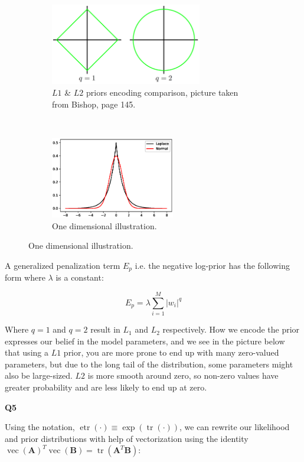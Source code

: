 \documentclass[a4paper]{article}
\DeclareMathOperator{\tr}{tr}
\DeclareMathOperator{\vect}{vec}
\DeclareMathOperator{\etr}{etr}
\begin{document}
\begin{figure}[t!]
	\centering
	\begin{subfigure}[t]{0.5\textwidth}
		\centering
		\includegraphics[height=1.4in]{L2.png}
		\caption{$L1$ \& $L2$ priors encoding comparison, picture taken from Bishop, page 145.}
	\end{subfigure}%
	~ 
	\begin{subfigure}[t]{0.5\textwidth}
		\centering
		\includegraphics[height=1.4in]{Place.eps}
		\caption{One dimensional illustration.}
	\end{subfigure}
\end{figure}

\noindent A generalized penalization term $E_p$ i.e. the negative log-prior has the following form where $\lambda$ is a constant:

\begin{equation*}
E_p=\lambda\sum_{i=1}^{M}\vert w_i\vert^{q}
\end{equation*}

\noindent Where $q=1$ and $q=2$ result in $L_1$ and $L_2$ respectively. How we encode the prior expresses our belief in the model parameters, and we see in the picture below that using a $L1$ prior, you are more prone to end up with many zero-valued parameters, but due to the long tail of the distribution, some parameters might also be large-sized. $L2$ is more smooth around zero, so non-zero values have greater probability and are less likely to end up at zero.

\hfill

\noindent\textbf{Q5} 

\noindent\makebox[\linewidth]{\rule{\textwidth}{0.4pt}}

\hfill

\noindent Using the notation, $\etr(\cdot)\equiv\exp(\tr(\cdot))$, we can rewrite our likelihood and prior distributions with help of vectorization using the identity $\vect(\mathbf{A})^T\vect(\mathbf{B})=\tr(\mathbf{A}^T\mathbf{B})$:
\end{document}
